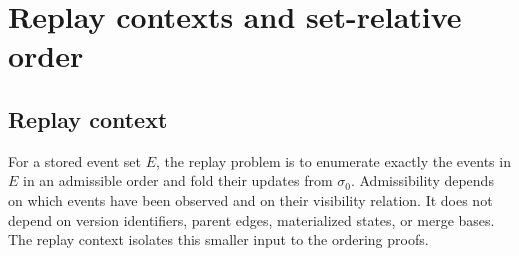 \documentclass[11pt]{article}
\theoremstyle{definition}
\newcommand{\init}{\sigma_0}
\begin{document}
\section{Replay contexts and set-relative order}
\label{sec:replay}

\subsection{Replay context}

For a stored event set $E$, the replay problem is to enumerate exactly the
events in $E$ in an admissible order and fold their updates from $\init$.
Admissibility depends on which events have been observed and on their
visibility relation. It does not depend on version identifiers, parent edges,
materialized states, or merge bases. The replay context isolates this smaller
input to the ordering proofs.
\end{document}
